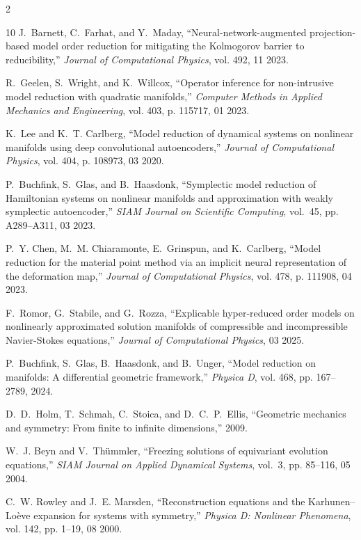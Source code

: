 \documentclass{article}
\begin{document}
\begin{multicols}{2}
\begin{thebibliography}{10}
J.~Barnett, C.~Farhat, and Y.~Maday, ``Neural-network-augmented projection-based model order reduction for mitigating the {Kolmogorov} barrier to reducibility,'' \emph{Journal of Computational Physics}, vol. 492, 11 2023.

R.~Geelen, S.~Wright, and K.~Willcox, ``Operator inference for non-intrusive model reduction with quadratic manifolds,'' \emph{Computer Methods in Applied Mechanics and Engineering}, vol. 403, p. 115717, 01 2023.

K.~Lee and K.~T. Carlberg, ``Model reduction of dynamical systems on nonlinear manifolds using deep convolutional autoencoders,'' \emph{Journal of Computational Physics}, vol. 404, p. 108973, 03 2020.

P.~Buchfink, S.~Glas, and B.~Haasdonk, ``Symplectic model reduction of {Hamiltonian} systems on nonlinear manifolds and approximation with weakly symplectic autoencoder,'' \emph{SIAM Journal on Scientific Computing}, vol.~45, pp. A289--A311, 03 2023.

P.~Y. Chen, M.~M. Chiaramonte, E.~Grinspun, and K.~Carlberg, ``Model reduction for the material point method via an implicit neural representation of the deformation map,'' \emph{Journal of Computational Physics}, vol. 478, p. 111908, 04 2023.

F.~Romor, G.~Stabile, and G.~Rozza, ``Explicable hyper-reduced order models on nonlinearly approximated solution manifolds of compressible and incompressible {Navier}-{Stokes} equations,'' \emph{Journal of Computational Physics}, 03 2025.

P.~Buchfink, S.~Glas, B.~Haasdonk, and B.~Unger, ``Model reduction on manifolds: A differential geometric framework,'' \emph{Physica D}, vol. 468, pp. 167--2789, 2024.

D.~D.~Holm, T.~Schmah, C.~Stoica, and D.~C.~P.~Ellis, ``Geometric mechanics and symmetry: From finite to infinite dimensions,'' 2009.

W.~J. Beyn and V.~Thümmler, ``Freezing solutions of equivariant evolution equations,'' \emph{SIAM Journal on Applied Dynamical Systems}, vol.~3, pp. 85--116, 05 2004.

C.~W. Rowley and J.~E. Marsden, ``Reconstruction equations and the {Karhunen}–{Loève} expansion for systems with symmetry,'' \emph{Physica D: Nonlinear Phenomena}, vol. 142, pp. 1--19, 08 2000.


\end{thebibliography}
\end{multicols}
\end{document}
